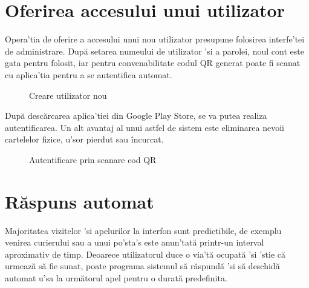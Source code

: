 \section{Oferirea accesului unui utilizator}

Opera'tia de oferire a accesului unui nou utilizator presupune folosirea interfe'tei de administrare. După setarea numeului de utilizator 'si a parolei, noul cont este gata pentru folosit, iar pentru convenabilitate codul QR generat poate fi scanat cu aplica'tia pentru a se autentifica automat.

\begin{figure}[H]
\begin{center}
  \hfil
  \caption{Creare utilizator nou}
  \label{fig:useradd}
\end{center}
\end{figure}

După descărcarea aplica'tiei din Google Play Store, se va putea realiza autentificarea. Un alt avantaj al unui astfel de sistem este eliminarea nevoii cartelelor fizice, u'sor pierdut sau încurcat.

\begin{figure}[H]
\begin{center}
  \hfil
  \caption{Autentificare prin scanare cod QR}
  \label{fig:androidqr}
\end{center}
\end{figure}

\section{Răspuns automat}

Majoritatea vizitelor 'si apelurilor la interfon sunt predictibile, de exemplu venirea curierului sau a unui po'sta's este anun'tată printr-un interval aproximativ de timp. Deoarece utilizatorul duce o via'tă ocupată 'si 'stie că urmează să fie sunat, poate programa sistemul să răspundă 'si să deschidă automat u'sa la următorul apel pentru o durată predefinita.


